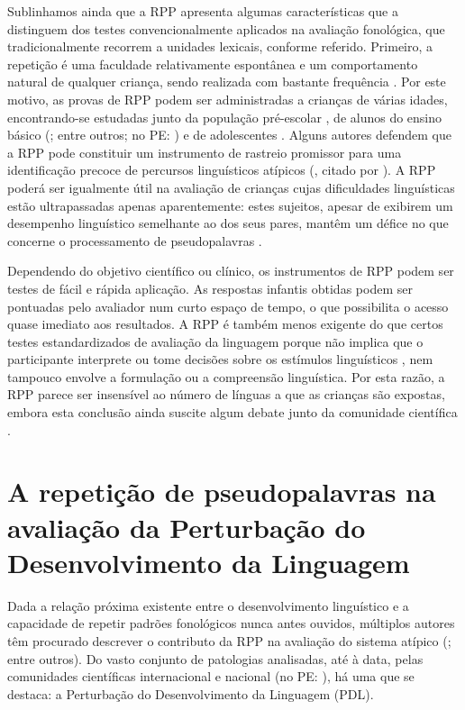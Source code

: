\documentclass[output=paper,colorlinks,citecolor=brown,booklanguage=portuguese]{langscibook}
\begin{document}
Sublinhamos ainda que a RPP apresenta algumas características que a distinguem dos testes convencionalmente aplicados na avaliação fonológica, que tradicionalmente recorrem a unidades lexicais, conforme referido. Primeiro, a repetição é uma faculdade relativamente espontânea e um comportamento natural de qualquer criança, sendo realizada com bastante frequência \citep{Gathercole2006}. Por este motivo, as provas de RPP podem ser administradas a crianças de várias idades, encontrando-se estudadas junto da população pré-escolar \citep{Chiat2007}, de alunos do ensino básico (\citealp{Weismer2000, Gathercole1994}; entre outros; no PE: \citealp{CruzSantos2009, Ribeiro2011}) e de adolescentes \citep{ContiRamsdem2001}. Alguns autores defendem que a RPP pode constituir um instrumento de rastreio promissor para uma identificação precoce de percursos linguísticos atípicos (\citealp{ContiRamsden2003a}, citado por \citealp{Archibald2008, Chiat2007}). A RPP poderá ser igualmente útil na avaliação de crianças cujas dificuldades linguísticas estão ultrapassadas apenas aparentemente: estes sujeitos, apesar de exibirem um desempenho linguístico semelhante ao dos seus pares, mantêm um défice no que concerne o processamento de pseudopalavras \citep{Bishop1996, ContiRamsdem2001}.

\largerpage
Dependendo do objetivo científico ou clínico, os instrumentos de RPP podem ser testes de fácil e rápida aplicação. As respostas infantis obtidas podem ser pontuadas pelo avaliador num curto espaço de tempo, o que possibilita o acesso quase imediato aos resultados. A RPP é também menos exigente do que certos testes estandardizados de avaliação da linguagem porque não implica que o participante interprete ou tome decisões sobre os estímulos linguísticos \citep{Chiat2007}, nem tampouco envolve a formulação ou a compreensão linguística. Por esta razão, a RPP parece ser insensível ao número de línguas a que as crianças são expostas, embora esta conclusão ainda suscite algum debate junto da comunidade científica \citep{Chiat2015}.

\section{A repetição de pseudopalavras na avaliação da Perturbação do Desenvolvimento da Linguagem}\label{sec:cap9sec2}
Dada a relação próxima existente entre o desenvolvimento linguístico e a capacidade de repetir padrões fonológicos nunca antes ouvidos, múltiplos autores têm procurado descrever o contributo da RPP na avaliação do sistema atípico (\citealp{Bishop1996, Weismer2000, ContiRamsdem2001, Friedmann2008, Gallon2007, Marshall2009}; entre outros). Do vasto conjunto de patologias analisadas, até à data, pelas comunidades científicas internacional e nacional (no PE: \citealp{CruzSantos2009, Coutinho2014}), há uma que se destaca: a Perturbação do Desenvolvimento da Linguagem (PDL).
\end{document}

